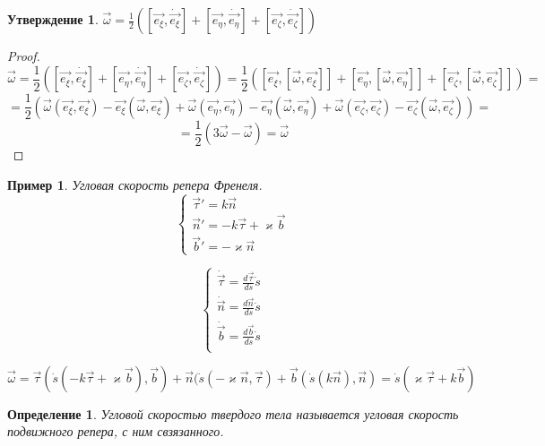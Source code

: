 \documentclass{article}
\newtheorem*{df}{Определение}
\newtheorem{ass}{Утверждение}
\newtheorem*{xmp}{Пример}
\begin{document}
  \begin{ass}
  $ \vec{\omega} = \frac{1}{2} ([\vec{e_{\xi}}, \dot{\vec{e_{\xi}}}] + [\vec{e_{\eta}}, \dot{\vec{e_{\eta}}}] + [\vec{e_{\zeta}}, \dot{\vec{e_{\zeta}}}]) $
  \end{ass}
  \begin{proof}
  $$ \vec{\omega} 
  = \frac{1}{2} ([\vec{e_{\xi}}, \dot{\vec{e_{\xi}}}] + [\vec{e_{\eta}}, \dot{\vec{e_{\eta}}}] + [\vec{e_{\zeta}}, \dot{\vec{e_{\zeta}}}]) 
  = \frac{1}{2} ([\vec{e_{\xi}}, [\vec{\omega}, \vec{e_{\xi}}]] + [\vec{e_{\eta}}, [\vec{\omega}, \vec{e_{\eta}}]] + [\vec{e_{\zeta}}, [\vec{\omega}, \vec{e_{\zeta}}]]) = $$
  $$ = \frac{1}{2} \left( \vec{\omega}(\vec{e_{\xi}}, \vec{e_{\xi}}) - \vec{e_{\xi}}(\vec{\omega}, \vec{e_{\xi}}) + \vec{\omega}(\vec{e_{\eta}}, \vec{e_{\eta}}) - \vec{e_{\eta}}(\vec{\omega}, \vec{e_{\eta}}) + \vec{\omega}(\vec{e_{\zeta}}, \vec{e_{\zeta}}) - \vec{e_{\zeta}}(\vec{\omega}, \vec{e_{\zeta}}) \right) = $$ 
  $$ = \frac{1}{2}(3\vec{\omega} - \vec{\omega}) = \vec{\omega} $$
  \end{proof}
  
  \begin{xmp}
  Угловая скорость репера Френеля.
  $$ 
  \begin{cases}
  \vec{\tau}' = k \vec{n} \\
  \vec{n}' = - k\vec{\tau} + \varkappa \vec{b} \\
  \vec{b}' = -\varkappa\vec{n}
  \end{cases}
  $$
  
  $$
  \begin{cases}
  \dot{\vec{\tau}} = \frac{d\vec{\tau}}{ds} \dot s \\
  \dot{\vec{n}} = \frac{d\vec{n}}{ds} \dot s \\
  \dot{\vec{b}} = \frac{d\vec{b}}{ds} \dot s \\
  \end{cases} 
  $$
  
  $$ \vec{\omega} = \vec{\tau}(\dot s (-k\vec{\tau} + \varkappa\vec{b}), \vec{b}) + \vec{n}(\dot s (-\varkappa\vec{n}, \vec{\tau}) + \vec{b}(\dot s(k \vec{n}), \vec{n}) = \dot s (\varkappa\vec{\tau} + k\vec{b}) $$
  \end{xmp}
  
  \begin{df}
  Угловой скоростью твердого тела называется угловая скорость подвижного репера, с ним свзязанного.
  \end{df}
 
\end{document}
